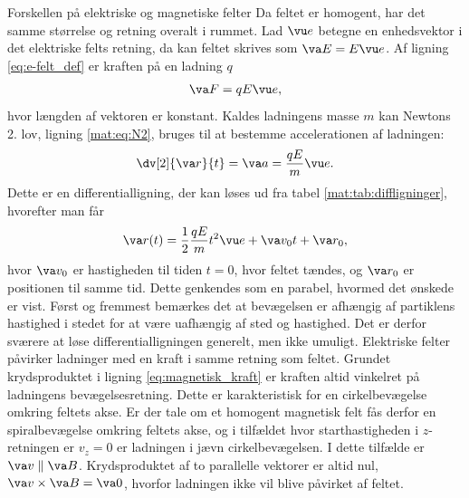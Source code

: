 \begin{opgave}{Forskellen på elektriske og magnetiske felter} \label{opg:EvsB}
    \opg Da feltet er homogent, har det samme størrelse og retning overalt i rummet. Lad $\vu e$ betegne en enhedsvektor i det elektriske felts retning, da kan feltet skrives som $\va E = E\vu e$. Af ligning \eqref{eq:e-felt_def} er kraften på en ladning $q$
    \begin{align*}
        \va F = qE\vu e,
    \end{align*}
    hvor længden af vektoren er konstant. Kaldes ladningens masse $m$ kan Newtons 2. lov, ligning \eqref{mat:eq:N2}, bruges til at bestemme accelerationen af ladningen:
    \begin{align*}
        \dv[2]{\va r}{t} = \va a = \frac{qE}{m}\vu e.
    \end{align*}
    Dette er en differentialligning, der kan løses ud fra tabel \ref{mat:tab:diffligninger}, hvorefter man får
    \begin{align*}
        \va r(t) = \frac{1}{2}\frac{qE}{m}t^2\vu e + \va v_0 t + \va r_0,
    \end{align*}
    hvor $\va v_0$ er hastigheden til tiden $t=0$, hvor feltet tændes, og $\va r_0$ er positionen til samme tid. Dette genkendes som en parabel, hvormed det ønskede er vist.
    \opg Først og fremmest bemærkes det at bevægelsen er afhængig af partiklens hastighed i stedet for at være uafhængig af sted og hastighed. Det er derfor sværere at løse differentialligningen generelt, men ikke umuligt. Elektriske felter påvirker ladninger med en kraft i samme retning som feltet. Grundet krydsproduktet i ligning \eqref{eq:magnetisk_kraft} er kraften altid vinkelret på ladningens bevægelsesretning. Dette er karakteristisk for en cirkelbevægelse omkring feltets akse. Er der tale om et homogent magnetisk felt fås derfor en spiralbevægelse omkring feltets akse, og i tilfældet hvor starthastigheden i $z$-retningen er $v_z = 0$ er ladningen i jævn cirkelbevægelsen.
    \opg I dette tilfælde er $\va v \parallel \va B$. Krydsproduktet af to parallelle vektorer er altid nul, $\va v \times \va B = \va 0$, hvorfor ladningen ikke vil blive påvirket af feltet.
\end{opgave}

